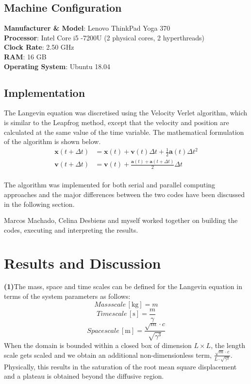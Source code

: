 \documentclass[11pt, oneside]{article}
\begin{document}
\subsection{Machine Configuration}
	\textbf{Manufacturer \& Model}: Lenovo ThinkPad Yoga 370\\
	\textbf{Processor}: Intel Core i5 -7200U (2 physical cores, 2 hyperthreads)\\
	\textbf{Clock Rate}:  2.50 GHz\\
	\textbf{RAM}:  16 GB\\
	\textbf{Operating System}: Ubuntu 18.04\\
	
\subsection{Implementation}
The Langevin equation was discretised using the Velocity Verlet algorithm, which is similar to the Leapfrog method, except that the velocity and position are calculated at the same value of the time variable. The mathematical formulation of the algorithm is shown below.
\begin{equation}
  \begin{split}
    \mathbf{x}(t + \Delta t) &= \mathbf{x}(t) +  \mathbf{v}(t)\Delta t + \frac{1}{2} \mathbf{a}(t) \Delta t^2 \\
    \mathbf{v}(t + \Delta t) &= \mathbf{v}(t) + \frac{\mathbf{a}(t) + \mathbf{a}(t+\Delta t)}{2} \Delta t \\
  \end{split}
\end{equation}

The algorithm was implemented for both serial and parallel computing approaches and the major differences between the two codes have been discussed in the following section.    

Marcos Machado, Celina Desbiens and myself worked together on building the codes, executing and interpreting the results. 
	
\section{Results and Discussion}
\textbf{(1)}\quad The mass, space and time scales can be defined for the  Langevin equation in terms of the system parameters as follows: \[Mass scale \, [\si{\kilo\gram}] = m\]  \[Time scale \, [\si{\second}] = \frac{m}{\gamma}\]  \[Space scale \, [\si{\metre}] = \frac{\sqrt{m}\cdot c}{\sqrt{\gamma^3}}\] When the domain is bounded within a closed box of dimension \(L \times L\), the length scale gets scaled and we obtain an additional non-dimensionless term, \(\frac{\sqrt{m}\cdot c}{L\cdot\sqrt{\gamma^3}}\). Physically, this results in the saturation of the root mean square displacement  and a plateau is obtained beyond the diffusive region.
\end{document}
